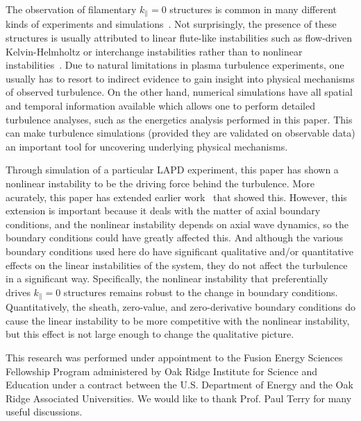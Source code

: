 \documentclass[showpacs,preprintnumbers,amsmath,amssymb,superscriptaddress,aip]{revtex4-1}
\def\para{\parallel}
\begin{document}
The observation of filamentary $k_\para = 0$ structures is common in many different kinds of experiments and simulations~\cite{rogers2010,kamataki2007,brochard2005}. 
Not surprisingly, the presence of these structures is usually attributed to linear flute-like instabilities such as flow-driven Kelvin-Helmholtz or interchange instabilities rather than to 
nonlinear instabilities~\cite{rogers2010,kamataki2007,brochard2005}.
Due to natural limitations in plasma turbulence experiments, one usually has to resort to indirect evidence to 
gain insight into physical mechanisms of observed turbulence. 
On the other hand, numerical simulations have all spatial and temporal information available which allows one to perform detailed turbulence analyses, such as the energetics analysis
performed in this paper. 
This can make turbulence simulations (provided they are validated on observable data) an important tool for uncovering underlying physical mechanisms.

Through simulation of a particular LAPD experiment, this paper has shown a nonlinear instability to be the driving force behind the turbulence. More acurately, this paper has extended
earlier work~\cite{friedman2012b} that showed this. However, this extension is important because it deals with the matter of axial boundary conditions, and the nonlinear instability
depends on axial wave dynamics, so the boundary conditions could have greatly affected this. And although the various boundary conditions used here do
have significant qualitative and/or quantitative effects on the linear instabilities of the system, they do not affect the turbulence in a significant way.
Specifically, the nonlinear instability that preferentially drives $k_\para = 0$ structures remains robust to the change in boundary conditions. Quantitatively, the sheath, zero-value,
and zero-derivative boundary conditions
do cause the linear instability to be more competitive with the nonlinear instability, but this effect is not large enough to change the qualitative picture. 




\begin{acknowledgments}
This research was performed under appointment to the Fusion Energy Sciences Fellowship Program administered by Oak Ridge Institute for
Science and Education under a contract between the U.S. Department of Energy and the Oak Ridge Associated Universities. We would like to thank Prof. Paul Terry for many useful discussions.
\end{acknowledgments}
\end{document}
